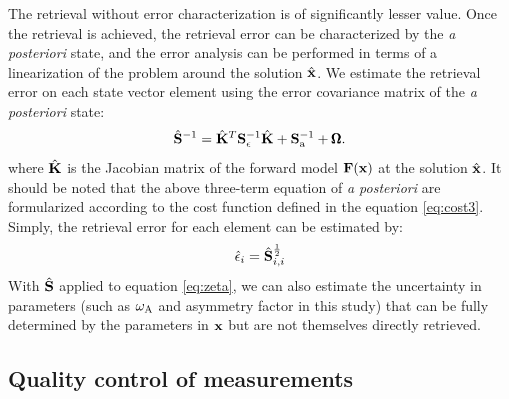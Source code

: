 The retrieval without error characterization is of significantly lesser
value. Once the retrieval is achieved, the retrieval error can be
characterized by the \textit{a posteriori} state, and the error analysis 
can be performed in terms of a linearization of the problem around 
the solution $\hat{\mathbf{x}}$. We estimate the retrieval error on each 
state vector element using the error covariance matrix of the 
\textit{a posteriori} state:
\begin{equation}
\hat{\mathbf{S}}^{-1} = \hat{\mathbf{K}}^T\mathbf{S}_\epsilon^{-1}\hat{\mathbf{K}}+\mathbf{S}_\text{a}^{-1} +
\pmb{\Omega}. 
\label{eq:shat3}
\end{equation}
where $\hat{\mathbf{K}}$ is the Jacobian matrix of the forward model $\mathbf{F}(\mathbf{x})$ 
at the solution $\hat{\mathbf{x}}$. It should be noted that the above 
three-term equation of \textit{a posteriori} are formularized 
according to the cost function defined in the 
equation \eqref{eq:cost3}. Simply, the retrieval 
error for each element can be estimated by:
\begin{equation}
\hat{\epsilon}_i=\hat{\mathbf{S}}_{i,i}^{\frac{1}{2}}
\end{equation}
With $\hat{\mathbf{S}}$ applied to equation \eqref{eq:zeta}, we can also estimate
the uncertainty in parameters (such as $\omega_\text{A}$ and asymmetry factor in this
study) that can be fully determined by the parameters in $\mathbf{x}$ but are not
themselves directly retrieved.

\subsection{Quality control of measurements}
\label{subsec:alg-qaulity}

